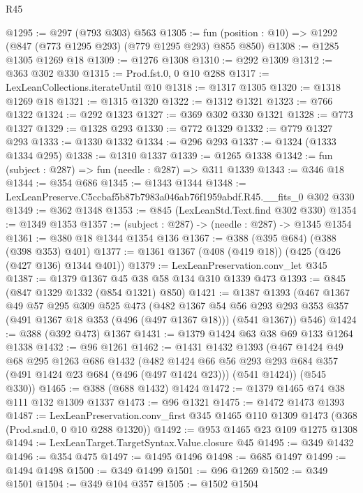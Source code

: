 \begin{lexlean}{R45}
\begin{coremodule}
@1295 := @297 (@793 @303) @563
@1305 := fun (position : @10) => @1292 (@847 (@773 @1295 @293) (@779 @1295 @293) @855 @850)
@1308 := @1285 @1305 @1269 @18
@1309 := @1276 @1308
@1310 := @292 @1309
@1312 := @363 @302 @330
@1315 := Prod.fst.{0, 0} @10 @288
@1317 := LexLeanCollections.iterateUntil @10
@1318 := @1317 @1305
@1320 := @1318 @1269 @18
@1321 := @1315 @1320
@1322 := @1312 @1321
@1323 := @766 @1322
@1324 := @292 @1323
@1327 := @369 @302 @330 @1321
@1328 := @773 @1327
@1329 := @1328 @293
@1330 := @772 @1329
@1332 := @779 @1327 @293
@1333 := @1330 @1332
@1334 := @296 @293
@1337 := @1324 (@1333 @1334 @295)
@1338 := @1310 @1337
@1339 := @1265 @1338
@1342 := fun (subject : @287) => fun (needle : @287) => @311 @1339
@1343 := @346 @18
@1344 := @354 @686
@1345 := @1343 @1344
@1348 := LexLeanPreserve.C5ccbaf5b87b7983a046ab76f1959abdf.R45.__fits_0 @302 @330
@1349 := @362 @1348
@1353 := @845 (LexLeanStd.Text.find @302 @330)
@1354 := @1349 @1353
@1357 := (subject : @287) -> (needle : @287) -> @1345 @1354
@1361 := @380 @18 @1344 @1354 @136
@1367 := @388 (@395 @684) (@388 (@398 @353) @401)
@1377 := @1361 @1367 (@408 (@419 @18)) (@425 (@426 (@427 @136) @1344 @401))
@1379 := LexLeanPreservation.conv_let @345
@1387 := @1379 @1367 @45 @38 @58 @134 @310 @1339 @473
@1393 := @845 (@847 @1329 @1332 (@854 @1321) @850)
@1421 := @1387
    @1393
    (@467
      @1367
      @49
      @57
      @295
      @309
      @525
      @473
      (@482
        @1367
        @54
        @56
        @293
        @293
        @353
        @357
        (@491 @1367 @18 @353 (@496 (@497 @1367 @18)))
        (@541 @1367))
      @546)
@1424 := @388 (@392 @473) @1367
@1431 := @1379 @1424 @63 @38 @69 @133 @1264 @1338
@1432 := @96 @1261
@1462 := @1431
    @1432
    @1393
    (@467
      @1424
      @49
      @68
      @295
      @1263
      @686
      @1432
      (@482
        @1424
        @66
        @56
        @293
        @293
        @684
        @357
        (@491 @1424 @23 @684 (@496 (@497 @1424 @23)))
        (@541 @1424))
      (@545 @330))
@1465 := @388 (@688 @1432) @1424
@1472 := @1379 @1465 @74 @38 @111 @132 @1309 @1337
@1473 := @96 @1321
@1475 := @1472 @1473 @1393
@1487 := LexLeanPreservation.conv_first
    @345
    @1465
    @110
    @1309
    @1473
    (@368 (Prod.snd.{0, 0} @10 @288 @1320))
@1492 := @953 @1465 @23 @109 @1275 @1308
@1494 := LexLeanTarget.TargetSyntax.Value.closure @45
@1495 := @349 @1432
@1496 := @354 @475
@1497 := @1495 @1496
@1498 := @685 @1497
@1499 := @1494 @1498
@1500 := @349 @1499
@1501 := @96 @1269
@1502 := @349 @1501
@1504 := @349 @104 @357
@1505 := @1502 @1504

\end{coremodule}
\end{lexlean}
